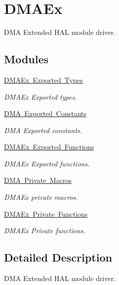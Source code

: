 \hypertarget{group___d_m_a_ex}{}\section{D\+M\+A\+Ex}
\label{group___d_m_a_ex}


D\+MA Extended H\+AL module driver.  


\subsection*{Modules}
\begin{DoxyCompactItemize}
\item 
\mbox{\hyperlink{group___d_m_a_ex___exported___types}{D\+M\+A\+Ex Exported Types}}
\begin{DoxyCompactList}\small\item\em D\+M\+A\+Ex Exported types. \end{DoxyCompactList}\item 
\mbox{\hyperlink{group___d_m_a___exported___constants}{D\+M\+A Exported Constants}}
\begin{DoxyCompactList}\small\item\em D\+MA Exported constants. \end{DoxyCompactList}\item 
\mbox{\hyperlink{group___d_m_a_ex___exported___functions}{D\+M\+A\+Ex Exported Functions}}
\begin{DoxyCompactList}\small\item\em D\+M\+A\+Ex Exported functions. \end{DoxyCompactList}\item 
\mbox{\hyperlink{group___d_m_a_ex___private___macros}{D\+M\+A Private Macros}}
\begin{DoxyCompactList}\small\item\em D\+M\+A\+Ex private macros. \end{DoxyCompactList}\item 
\mbox{\hyperlink{group___d_m_a_ex___private___functions}{D\+M\+A\+Ex Private Functions}}
\begin{DoxyCompactList}\small\item\em D\+M\+A\+Ex Private functions. \end{DoxyCompactList}\end{DoxyCompactItemize}


\subsection{Detailed Description}
D\+MA Extended H\+AL module driver. 

